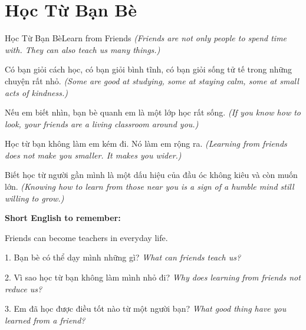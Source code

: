 \section{Học Từ Bạn Bè}
\begin{truyen}{Học Từ Bạn Bè}{Learn from Friends}
\textit{(Friends are not only people to spend time with. They can also teach us many things.)}

Có bạn giỏi cách học, có bạn giỏi bình tĩnh, có bạn giỏi sống tử tế trong những chuyện rất nhỏ.
\textit{(Some are good at studying, some at staying calm, some at small acts of kindness.)}

Nếu em biết nhìn, bạn bè quanh em là một lớp học rất sống.
\textit{(If you know how to look, your friends are a living classroom around you.)}

Học từ bạn không làm em kém đi. Nó làm em rộng ra.
\textit{(Learning from friends does not make you smaller. It makes you wider.)}
\end{truyen}

\begin{baihoc}
Biết học từ người gần mình là một dấu hiệu của đầu óc không kiêu và còn muốn lớn.
\textit{(Knowing how to learn from those near you is a sign of a humble mind still willing to grow.)}
\end{baihoc}

\begin{ghinhoanh}
\textbf{Short English to remember:}

Friends can become teachers in everyday life.

\end{ghinhoanh}

\begin{tuhocnhanh}
1. Bạn bè có thể dạy mình những gì? \textit{What can friends teach us?}

2. Vì sao học từ bạn không làm mình nhỏ đi? \textit{Why does learning from friends not reduce us?}

3. Em đã học được điều tốt nào từ một người bạn? \textit{What good thing have you learned from a friend?}
\end{tuhocnhanh}
\ngancach

